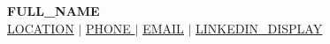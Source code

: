\begin{center}
    \textbf{\Huge \scshape {{FULL_NAME}}} \\ \vspace{4pt}
    \footnotesize {\underline{{{LOCATION}}}} $ | $
    {\underline{{{PHONE}} }} $ | $
    \href{mailto:{{EMAIL}}}{\underline{{{EMAIL}}}} $|$
    \href{{{LINKEDIN_URL}}}{\underline{{{LINKEDIN_DISPLAY}}}}
\end{center}
